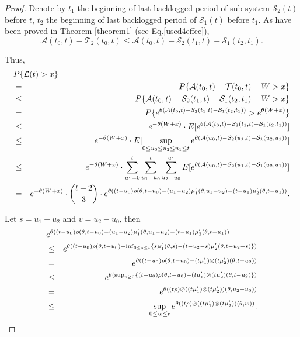 \documentclass[12pt]{article}
\newtheorem{proof}{Proof}
\begin{document}
\begin{proof}
Denote by $t_1$ the beginning of last backlogged period of sub-system $\mathcal{S}_2(t)$ before $t$, $t_2$ the beginning of last backlogged period of $\mathcal{S}_1(t)$ before $t_1$. As have been proved in Theorem \ref{theorem1} (see Eq.\ref{used4effec}),
$$\mathcal{A}(t_0,t)-\mathcal{T}_2(t_0,t) \leq \mathcal{A}(t_0,t)-\mathcal{S}_2(t_1,t)-\mathcal{S}_1(t_2,t_1).$$

Thus,
\begin{eqnarray*}
\lefteqn{P\{\mathcal{L}(t)>x\}}\\
&=&P\{\mathcal{A}(t_0,t)-\mathcal{T}(t_0,t)-W>x\}\\
&\leq&P\{\mathcal{A}(t_0,t)-\mathcal{S}_2(t_1,t)-\mathcal{S}_1(t_2,t_1)-W>x\}\\
&=&P\{e^{\theta(\mathcal{A}(t_0,t)-\mathcal{S}_2(t_1,t)-\mathcal{S}_1(t_2,t_1))}>e^{\theta(W+x)}\}\\
&\leq& e^{-\theta (W+x)}\cdot E[e^{\theta(\mathcal{A}(t_0,t)-\mathcal{S}_2(t_1,t)-\mathcal{S}_1(t_2,t_1))}]\\
&\leq& e^{-\theta (W+x)}\cdot E[\sup_{0\leq u_0\leq u_2\leq u_1\leq t}e^{\theta(\mathcal{A}(u_0,t)-\mathcal{S}_2(u_1,t)-\mathcal{S}_1(u_2,u_1))}]\\
&\leq& e^{-\theta (W+x)}\cdot \sum_{u_1=0}^t\sum_{u_1=u_0} ^t\sum_{u_2=u_0}^{u_1}E[e^{\theta(\mathcal{A}(u_0,t)-\mathcal{S}_2(u_1,t)-\mathcal{S}_1(u_2,u_1))}]\\
&=& e^{-\theta (W+x)}\cdot {t+2\choose 3}\cdot e^{\theta((t-u_0)\rho(\theta,t-u_0)-(u_1-u_2)\mu_1^\prime(\theta,u_1-u_2)-(t-u_1)\mu_2^\prime(\theta,t-u_1))}.
\end{eqnarray*}

Let $s=u_1-u_2$ and $v=u_2-u_0$, then
\begin{eqnarray*}
\lefteqn{e^{\theta((t-u_0)\rho(\theta,t-u_0)-(u_1-u_2)\mu_1^\prime(\theta,u_1-u_2)-(t-u_1)\mu_2^\prime(\theta,t-u_1))}}\\
&\leq & e^{\theta((t-u_0)\rho(\theta,t-u_0)-\inf_{0\leq s\leq t}\{s\mu_1^\prime(\theta,s)-(t-u_2-s)\mu_2^\prime(\theta,t-u_2-s)\})}\\
&=& e^{\theta((t-u_0)\rho(\theta,t-u_0)-(t\mu_1^\prime)\otimes(t\mu_2^\prime)(\theta,t-u_2))}\\
&\leq & e^{\theta(\sup_{v\geq 0}\{(t-u_0)\rho(\theta,t-u_0)-(t\mu_1^\prime)\otimes(t\mu_2^\prime)(\theta,t-u_2)\})}\\
&=& e^{\theta((t\rho)\oslash((t\mu_1^\prime)\otimes(t\mu_2^\prime))(\theta,u_2-u_0))}\\
&\leq& \sup_{0\leq w\leq t}e^{\theta((t\rho)\oslash((t\mu_1^\prime)\otimes(t\mu_2^\prime))(\theta,w))}.
\end{eqnarray*}


\end{proof}
\end{document}
